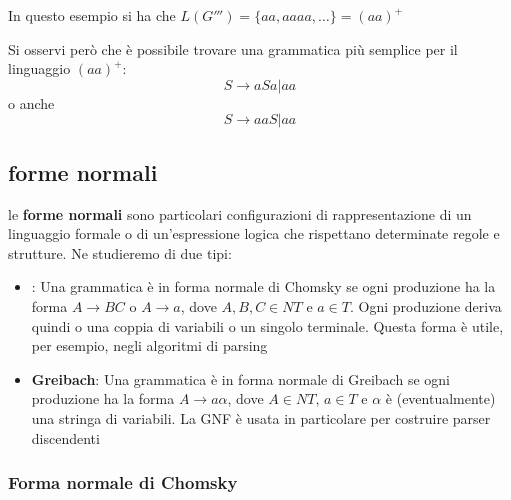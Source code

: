 In questo esempio si ha che $L(G''') = \{aa,aaaa, \dots\} = (aa)^+$

Si osservi però che è possibile trovare una grammatica più semplice per il linguaggio $ (aa)^+$:
\[
        S\to aSa | aa 
\]
o anche 
\[
    S\to aaS|aa    
\]

\subsection{forme normali}
le \textbf{forme normali} sono particolari configurazioni di rappresentazione di un linguaggio formale o di un'espressione logica che rispettano determinate regole e strutture. Ne studieremo di due tipi:
\begin{itemize}
    \item {}: Una grammatica è in forma normale di Chomsky se ogni produzione ha la forma $A\to BC$ o $A\to a$, dove $A, B,C\in NT$ e $a\in T$. Ogni produzione deriva quindi o una coppia di variabili o un singolo terminale. Questa forma è utile, per esempio, negli algoritmi di parsing
    \item \textbf{Greibach}: Una grammatica è in forma normale di Greibach se ogni produzione ha la forma $A\to a\alpha$, dove $A\in NT$, $a\in T$ e $\alpha$ è (eventualmente) una stringa di variabili. La GNF è usata in particolare per costruire parser discendenti
\end{itemize}
\subsubsection{Forma normale di Chomsky}

